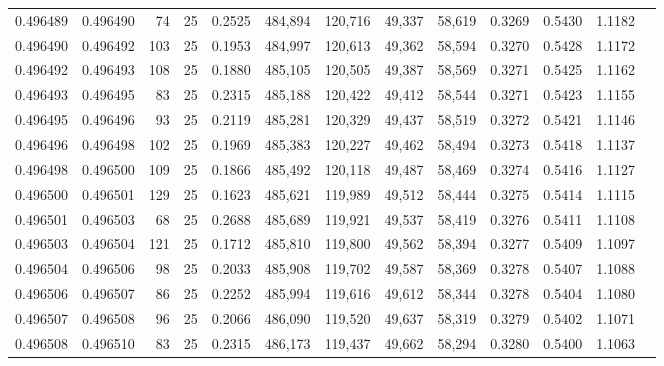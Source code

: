 \begin{tabular}{rrrrrrrrrrrrr}
0.496489 & 0.496490 &    74 &  25 &                                     0.2525 & 484,894 & 120,716 &  49,337 &  58,619 & 0.3269 & 0.5430 & 1.1182 \\
0.496490 & 0.496492 &   103 &  25 &                                     0.1953 & 484,997 & 120,613 &  49,362 &  58,594 & 0.3270 & 0.5428 & 1.1172 \\
0.496492 & 0.496493 &   108 &  25 &                                     0.1880 & 485,105 & 120,505 &  49,387 &  58,569 & 0.3271 & 0.5425 & 1.1162 \\
0.496493 & 0.496495 &    83 &  25 &                                     0.2315 & 485,188 & 120,422 &  49,412 &  58,544 & 0.3271 & 0.5423 & 1.1155 \\
0.496495 & 0.496496 &    93 &  25 &                                     0.2119 & 485,281 & 120,329 &  49,437 &  58,519 & 0.3272 & 0.5421 & 1.1146 \\
0.496496 & 0.496498 &   102 &  25 &                                     0.1969 & 485,383 & 120,227 &  49,462 &  58,494 & 0.3273 & 0.5418 & 1.1137 \\
0.496498 & 0.496500 &   109 &  25 &                                     0.1866 & 485,492 & 120,118 &  49,487 &  58,469 & 0.3274 & 0.5416 & 1.1127 \\
0.496500 & 0.496501 &   129 &  25 &                                     0.1623 & 485,621 & 119,989 &  49,512 &  58,444 & 0.3275 & 0.5414 & 1.1115 \\
0.496501 & 0.496503 &    68 &  25 &                                     0.2688 & 485,689 & 119,921 &  49,537 &  58,419 & 0.3276 & 0.5411 & 1.1108 \\
0.496503 & 0.496504 &   121 &  25 &                                     0.1712 & 485,810 & 119,800 &  49,562 &  58,394 & 0.3277 & 0.5409 & 1.1097 \\
0.496504 & 0.496506 &    98 &  25 &                                     0.2033 & 485,908 & 119,702 &  49,587 &  58,369 & 0.3278 & 0.5407 & 1.1088 \\
0.496506 & 0.496507 &    86 &  25 &                                     0.2252 & 485,994 & 119,616 &  49,612 &  58,344 & 0.3278 & 0.5404 & 1.1080 \\
0.496507 & 0.496508 &    96 &  25 &                                     0.2066 & 486,090 & 119,520 &  49,637 &  58,319 & 0.3279 & 0.5402 & 1.1071 \\
0.496508 & 0.496510 &    83 &  25 &                                     0.2315 & 486,173 & 119,437 &  49,662 &  58,294 & 0.3280 & 0.5400 & 1.1063 \\

\end{tabular}
